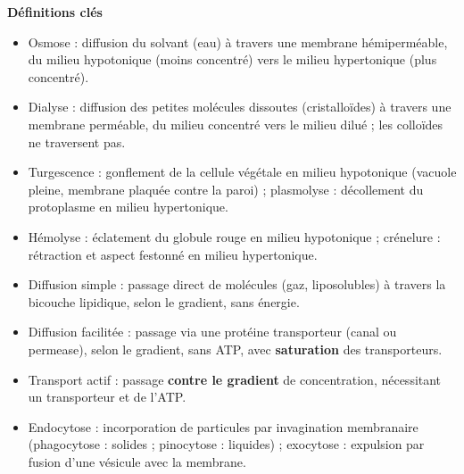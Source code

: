 \documentclass[11pt]{article}
\newcommand{\cle}[1]{{\popxbold\color{popdark}#1}}
\begin{document}
\begin{bilan}
\textbf{Définitions clés}
\begin{itemize}
  \item \cle{Osmose} : diffusion du solvant (eau) à travers une membrane hémiperméable, du milieu \cle{hypotonique} (moins concentré) vers le milieu \cle{hypertonique} (plus concentré).
  \item \cle{Dialyse} : diffusion des petites molécules dissoutes (cristalloïdes) à travers une membrane perméable, du milieu concentré vers le milieu dilué ; les colloïdes ne traversent pas.
  \item \cle{Turgescence} : gonflement de la cellule végétale en milieu hypotonique (vacuole pleine, membrane plaquée contre la paroi) ; \cle{plasmolyse} : décollement du protoplasme en milieu hypertonique.
  \item \cle{Hémolyse} : éclatement du globule rouge en milieu hypotonique ; \cle{crénelure} : rétraction et aspect festonné en milieu hypertonique.
  \item \cle{Diffusion simple} : passage direct de molécules (gaz, liposolubles) à travers la bicouche lipidique, selon le gradient, sans énergie.
  \item \cle{Diffusion facilitée} : passage via une protéine transporteur (canal ou permease), selon le gradient, sans ATP, avec \textbf{saturation} des transporteurs.
  \item \cle{Transport actif} : passage \textbf{contre le gradient} de concentration, nécessitant un transporteur et de l'\cle{ATP}.
  \item \cle{Endocytose} : incorporation de particules par invagination membranaire (\cle{phagocytose} : solides ; \cle{pinocytose} : liquides) ; \cle{exocytose} : expulsion par fusion d'une vésicule avec la membrane.
\end{itemize}


\end{bilan}
\end{document}
